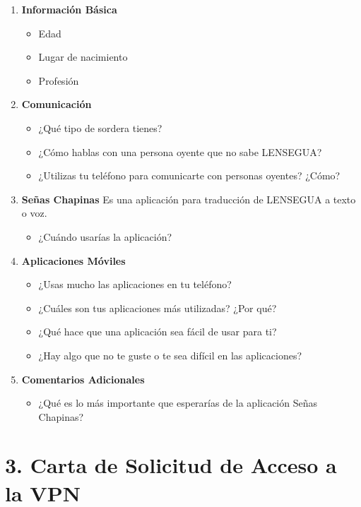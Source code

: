 \begin{enumerate}
    \item \textbf{Información Básica}
    \begin{itemize}
        \item Edad
        \item Lugar de nacimiento
        \item Profesión
    \end{itemize}

    \item \textbf{Comunicación}
    \begin{itemize}
        \item ¿Qué tipo de sordera tienes?
        \item ¿Cómo hablas con una persona oyente que no sabe LENSEGUA?
        \item ¿Utilizas tu teléfono para comunicarte con personas oyentes? ¿Cómo?
    \end{itemize}

    \item \textbf{Señas Chapinas}
    Es una aplicación para traducción de LENSEGUA a texto o voz.
    \begin{itemize}
        \item ¿Cuándo usarías la aplicación?
    \end{itemize}

    \item \textbf{Aplicaciones Móviles}
    \begin{itemize}
        \item ¿Usas mucho las aplicaciones en tu teléfono?
        \item ¿Cuáles son tus aplicaciones más utilizadas? ¿Por qué?
        \item ¿Qué hace que una aplicación sea fácil de usar para ti?
        \item ¿Hay algo que no te guste o te sea difícil en las aplicaciones?
    \end{itemize}

    \item \textbf{Comentarios Adicionales}
    \begin{itemize}
        \item ¿Qué es lo más importante que esperarías de la aplicación Señas Chapinas?
    \end{itemize}
\end{enumerate}






\section*{3. Carta de Solicitud de Acceso a la VPN}




